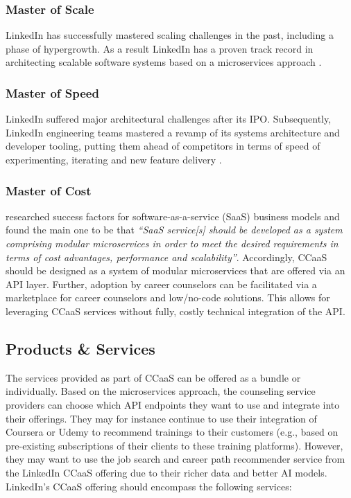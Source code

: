 \subsubsection{Master of Scale}

LinkedIn has successfully mastered scaling challenges in the past, including a phase of hypergrowth. As a result
LinkedIn has a proven track record in architecting scalable software systems based on a microservices approach
\citep{linkedinBriefHistoryScaling2015}. 

\subsubsection{Master of Speed}

LinkedIn suffered major architectural challenges after its IPO. Subsequently, LinkedIn engineering teams mastered a
revamp of its systems architecture and developer tooling, putting them ahead of competitors in terms of speed of
experimenting, iterating and new feature delivery \citep{vanceOperationInVersionCode2013}.

\subsubsection{Master of Cost}

\cite{floereckeSuccessFactorsSaaS2018} researched success factors for software-as-a-service (SaaS) business models and
found the main one to be that \textit{``SaaS service[s] should be developed as a system comprising modular microservices
in order to meet the desired requirements in terms of cost advantages, performance and scalability''}. Accordingly, CCaaS
should be designed as a system of modular microservices that are offered via an API layer. Further, adoption by career
counselors can be facilitated via a marketplace for career counselors and low/no-code solutions. This allows for leveraging
CCaaS services without fully, costly technical integration of the API.

\subsection{Products \& Services}

The services provided as part of CCaaS can be offered as a bundle or individually. Based on the microservices
approach, the counseling service providers can choose which API endpoints they want to use and integrate into 
their offerings. They may for instance continue to use their integration of Coursera or Udemy to recommend
trainings to their customers (e.g., based on pre-existing subscriptions of their clients to these training 
platforms). However, they may want to use the job search and career path recommender service from the LinkedIn
CCaaS offering due to their richer data and better AI models. LinkedIn's CCaaS offering should encompass the
following services:
\newline


